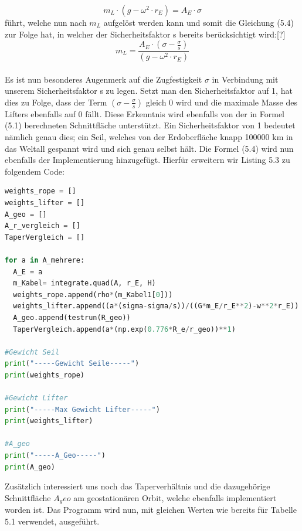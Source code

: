 \documentclass[a4paper, 10pt]{report}
\begin{document}
\begin{equation}
m_L \cdot (g - \omega^2 \cdot r_E) =  A_E \cdot \sigma
\end{equation}
führt, welche nun nach \( m_L \) aufgelöst werden kann und somit die Gleichung (5.4) zur Folge hat, in welcher der Sicherheitsfaktor s bereits berücksichtigt wird:[?]\\
\begin{equation}
m_L =   \frac{A_E \cdot (\sigma - \frac{\sigma}{s})} {(g - \omega^2 \cdot r_E)}
\end{equation}
\\
Es ist nun besonderes Augenmerk auf die Zugfestigkeit \( \sigma \) in Verbindung mit unserem Sicherheitsfaktor s zu legen. Setzt man den Sicherheitsfaktor auf 1, hat dies zu Folge, dass der Term   \((\sigma - \frac{\sigma}{s})\) gleich 0 wird und die maximale Masse des Lifters ebenfalls auf 0 fällt. Diese Erkenntnis wird ebenfalls von der in Formel (5.1) berechneten Schnittfläche unterstützt. Ein Sicherheitsfaktor von 1 bedeutet nämlich genau dies; ein Seil, welches von der Erdoberfläche knapp 100000 km in das Weltall gespannt wird und sich genau selbst hält.
Die Formel (5.4) wird nun ebenfalls der Implementierung hinzugefügt. Hierfür erweitern wir Listing 5.3 zu folgendem Code:\\
\begin{lstlisting}[language=Python, caption=Hinzufügen der Berechnungen zur Ermittlung des max. Gewichts des Lifters]
weights_rope = []
weights_lifter = []
A_geo = []
A_r_vergleich = []
TaperVergleich = []

for a in A_mehrere:
  A_E = a
  m_Kabel= integrate.quad(A, r_E, H)
  weights_rope.append(rho*(m_Kabel1[0]))
  weights_lifter.append((a*(sigma-sigma/s))/((G*m_E/r_E**2)-w**2*r_E))
  A_geo.append(testrun(R_geo))
  TaperVergleich.append(a*(np.exp(0.776*R_e/r_geo))**1)
  
#Gewicht Seil
print("-----Gewicht Seile-----")
print(weights_rope)

#Gewicht Lifter
print("-----Max Gewicht Lifter-----")
print(weights_lifter)

#A_geo
print("-----A_Geo-----")
print(A_geo)
\end{lstlisting}
Zusätzlich interessiert uns noch das Taperverhältnis und die dazugehörige Schnittfläche \( A_geo \) am geostationären Orbit, welche ebenfalls implementiert worden ist. Das Programm wird nun, mit gleichen Werten wie bereits für Tabelle 5.1 verwendet, ausgeführt. \\
\end{document}
